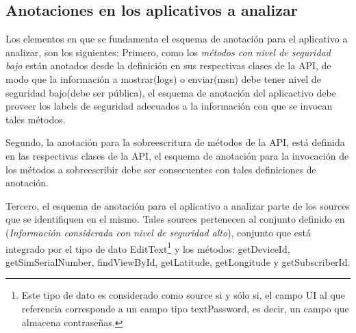 \subsection{Anotaciones en los aplicativos a analizar}
\label{subsec:apps}
Los elementos en que se fundamenta el esquema de anotación para el aplicativo a
analizar, son los siguientes:\newline 
Primero, como los \textit{métodos con nivel de seguridad bajo} están anotados
desde la definición en sus respectivas clases de la API, de modo que la
información a mostrar(logs) o enviar(msn) debe tener nivel de seguridad
bajo(debe ser pública), el esquema de anotación del aplicactivo debe proveer los
labels de seguridad adecuados a la información con que se invocan tales métodos.

Segundo, la anotación para la sobreescritura de métodos de la API, está definida
en las respectivas clases de la API, el esquema de anotación para la invocación
de los métodos a sobreescribir debe ser consecuentes con tales definiciones de
anotación.

Tercero, el esquema de anotación para el aplicativo a analizar parte de
los sources que se identifiquen en el mismo. Tales sources pertenecen al conjunto
definido en (\textit{Información considerada con nivel de seguridad alto}),
conjunto que está integrado por el tipo de dato EditText\footnote{Este tipo de
dato es considerado como source si y sólo si, el campo UI al que referencia
corresponde a un campo tipo textPassword, es decir, un campo que almacena
contraseñas.} y los métodos: getDeviceId, getSimSerialNumber, findViewById,
getLatitude, getLongitude y getSubscriberId.

